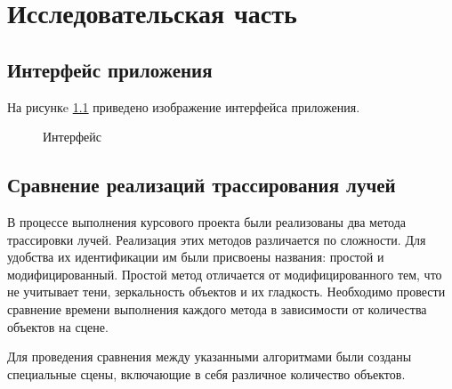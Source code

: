 \chapter{Исследовательская часть}

\section{Интерфейс приложения}

На рисункe  \ref{fig:interface} приведено изображение интерфейса приложения.

\begin{figure}[h!]
	\caption{Интерфейс}
	\label{fig:interface}
\end{figure}

\section{Сравнение реализаций трассирования лучей}

В процессе выполнения курсового проекта были реализованы два метода трассировки лучей. 
Реализация этих методов различается по сложности. 
Для удобства их идентификации им были присвоены названия: простой и модифицированный. 
Простой метод отличается от модифицированного тем, что не учитывает тени, зеркальность объектов и их гладкость.
Необходимо провести сравнение времени выполнения каждого метода в зависимости от количества объектов на сцене.

Для проведения сравнения между указанными алгоритмами были созданы специальные сцены, включающие в себя различное количество объектов.

